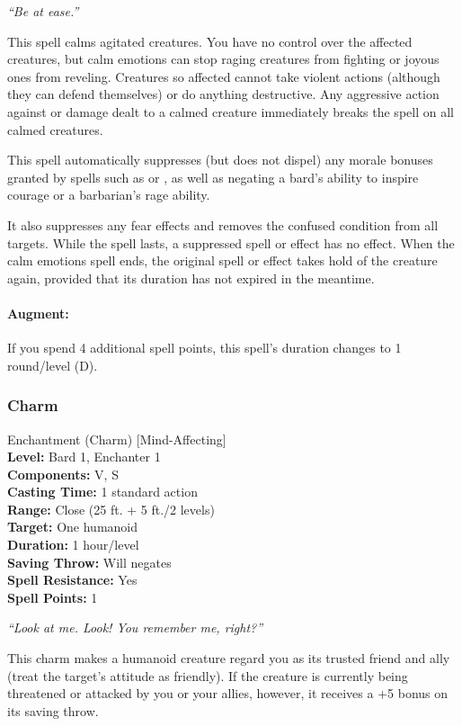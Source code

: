 \emph{``Be at ease.''}

This spell calms agitated creatures. 
You have no control over the affected creatures, but calm emotions can stop raging creatures from fighting or joyous ones from reveling. 
Creatures so affected cannot take violent actions (although they can defend themselves) or do anything destructive. 
Any aggressive action against or damage dealt to a calmed creature immediately breaks the spell on all calmed creatures.

This spell automatically suppresses (but does not dispel) any morale bonuses granted by spells such as  or , 
as well as negating a bard's ability to inspire courage or a barbarian's rage ability. 

It also suppresses any fear effects and removes the confused condition from all targets. 
While the spell lasts, a suppressed spell or effect has no effect. 
When the calm emotions spell ends, the original spell or effect takes hold of the creature again, provided that its duration has not expired in the meantime.

\paragraph{Augment:} If you spend 4 additional spell points, this spell's duration changes to 1 round/level (D).

\subsubsection{Charm}
\label{Spell:Charm}
Enchantment (Charm) [Mind-Affecting]
\\ \textbf{Level:} Bard 1, Enchanter 1
\\ \textbf{Components:} V, S
\\ \textbf{Casting Time:} 1 standard action
\\ \textbf{Range:} Close (25 ft. + 5 ft./2 levels)
\\ \textbf{Target:} One humanoid
\\ \textbf{Duration:} 1 hour/level
\\ \textbf{Saving Throw:} Will negates
\\ \textbf{Spell Resistance:} Yes
\\ \textbf{Spell Points:} 1

\emph{``Look at me. Look! You remember me, right?''}

This charm makes a humanoid creature regard you as its trusted friend and ally (treat the target's attitude as friendly). 
If the creature is currently being threatened or attacked by you or your allies, however, it receives a +5 bonus on its saving throw.

